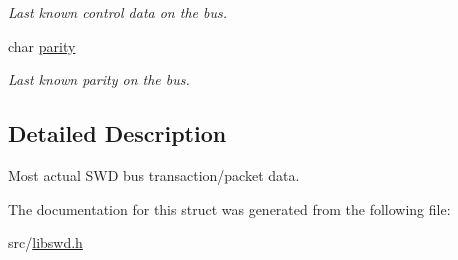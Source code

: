\begin{DoxyCompactItemize}
\begin{DoxyCompactList}\small\item\em Last known control data on the bus. \item\end{DoxyCompactList}\item 
\hypertarget{structswd__transaction__t_ac363d294a58239cea083ade02842fb13}{
char \hyperlink{structswd__transaction__t_ac363d294a58239cea083ade02842fb13}{parity}}
\label{structswd__transaction__t_ac363d294a58239cea083ade02842fb13}

\begin{DoxyCompactList}\small\item\em Last known parity on the bus. \item\end{DoxyCompactList}\end{DoxyCompactItemize}


\subsection{Detailed Description}
Most actual SWD bus transaction/packet data. 

The documentation for this struct was generated from the following file:\begin{DoxyCompactItemize}
\item 
src/\hyperlink{libswd_8h}{libswd.h}\end{DoxyCompactItemize}
